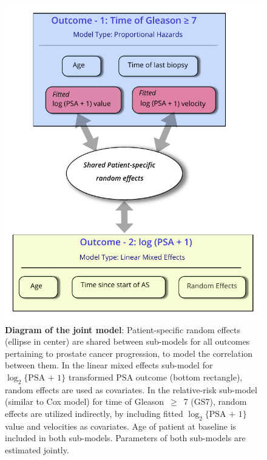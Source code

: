 \begin{figure}[!htb]
\centerline{\includegraphics[width=\columnwidth]{images/jm_blockdiag.pdf}}
\caption{\textbf{Diagram of the joint model}: Patient-specific random effects (ellipse in center) are shared between sub-models for all outcomes pertaining to prostate cancer progression, to model the correlation between them. In the linear mixed effects sub-model for $\log_2\{\mbox{PSA + 1}\}$ transformed PSA outcome (bottom rectangle), random effects are used as covariates. In the relative-risk sub-model (similar to Cox model) for time of Gleason~$\geq$~7 (GS7), random effects are utilized indirectly, by including fitted $\log_2\{\mbox{PSA + 1}\}$ value and velocities as covariates. Age of patient at baseline is included in both sub-models. Parameters of both sub-models are estimated jointly.}
\label{fig:jm_blockdiag}
\end{figure}

